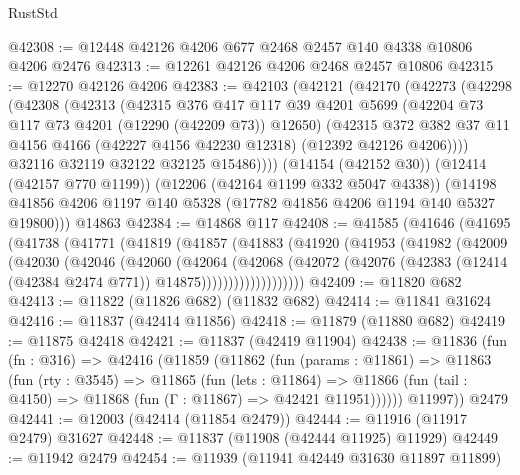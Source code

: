 \begin{lexlean}{RustStd}
\begin{coremodule}
@42308 := @12448 @42126 @4206 @677 @2468 @2457 @140 @4338 @10806 @4206 @2476
@42313 := @12261 @42126 @4206 @2468 @2457 @10806
@42315 := @12270 @42126 @4206
@42383 := @42103
    (@42121
      (@42170
        (@42273
          (@42298
            (@42308
              (@42313
                (@42315
                  @376
                  @417
                  @117
                  @39
                  @4201
                  @5699
                  (@42204 @73 @117 @73 @4201 (@12290 (@42209 @73)) @12650)
                  (@42315
                    @372
                    @382
                    @37
                    @11
                    @4156
                    @4166
                    (@42227 @4156 @42230 @12318)
                    (@12392 @42126 @4206))))
              @32116
              @32119
              @32122
              @32125
              @15486))))
      (@14154 (@42152 @30))
      (@12414 (@42157 @770 @1199))
      (@12206 (@42164 @1199 @332 @5047 @4338))
      (@14198 @41856 @4206 @1197 @140 @5328 (@17782 @41856 @4206 @1194 @140 @5327 @19800)))
    @14863
@42384 := @14868 @117
@42408 := @41585
    (@41646
      (@41695
        (@41738
          (@41771
            (@41819
              (@41857
                (@41883
                  (@41920
                    (@41953
                      (@41982
                        (@42009
                          (@42030
                            (@42046
                              (@42060
                                (@42064
                                  (@42068
                                    (@42072
                                      (@42076
                                        (@42383
                                          (@12414 (@42384 @2474 @771))
                                          @14875)))))))))))))))))))
@42409 := @11820 @682
@42413 := @11822 (@11826 @682) (@11832 @682)
@42414 := @11841 @31624
@42416 := @11837 (@42414 @11856)
@42418 := @11879 (@11880 @682)
@42419 := @11875 @42418
@42421 := @11837 (@42419 @11904)
@42438 := @11836
    (fun (fn : @316) =>
    @42416
      (@11859
        (@11862
          (fun (params : @11861) =>
          @11863
            (fun (rty : @3545) =>
            @11865
              (fun (lets : @11864) =>
              @11866 (fun (tail : @4150) => @11868 (fun (Γ : @11867) => @42421 @11951))))))
        @11997))
    @2479
@42441 := @12003 (@42414 (@11854 @2479))
@42444 := @11916 (@11917 @2479) @31627
@42448 := @11837 (@11908 (@42444 @11925) @11929)
@42449 := @11942 @2479
@42454 := @11939 (@11941 @42449 @31630 @11897 @11899)

\end{coremodule}
\end{lexlean}
